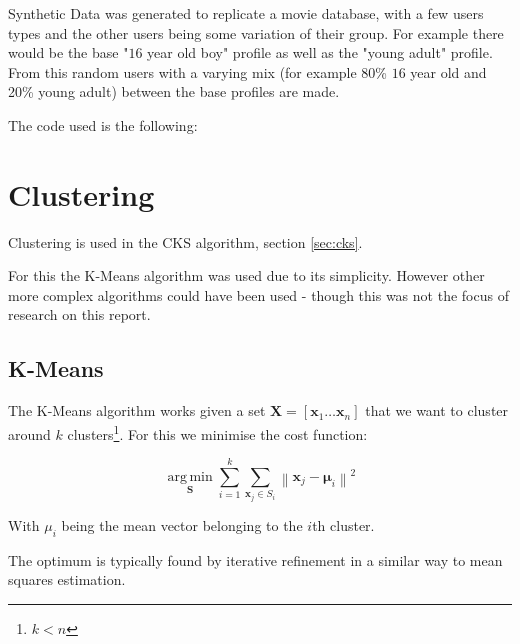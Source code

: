 Synthetic Data was generated to replicate a movie database, with a few users types and the other users being some variation of their group. For example there would be the base "$16$ year old boy" profile as well as the "young adult" profile. From this random users with a varying mix (for example 80\% $16$ year old and 20\% young adult) between the base profiles are made.

The code used is the following:
 
\section{Clustering}
Clustering is used in the CKS algorithm, section \ref{sec:cks}.

For this the K-Means algorithm was used due to its simplicity.  However other more complex algorithms could have been used - though this was not the focus of research on this report.
\subsection{K-Means}
The K-Means algorithm works given a set $\mathbf{X} = [ \mathbf{x}_1 \dots \mathbf{x}_n]$ that we want to cluster around $k$ clusters\footnote{$k<n$}. For this we minimise the cost function:

\begin{equation*}
\underset{\mathbf{S}} {\operatorname{arg\,min}}  \sum_{i=1}^{k} \sum_{\mathbf x_j \in S_i} \left\| \mathbf x_j - \boldsymbol\mu_i \right\|^2 
\end{equation*}

With $\mu_i$ being the mean vector belonging to the $i$th cluster.

The optimum is typically found by iterative refinement in a similar way to mean squares estimation.

